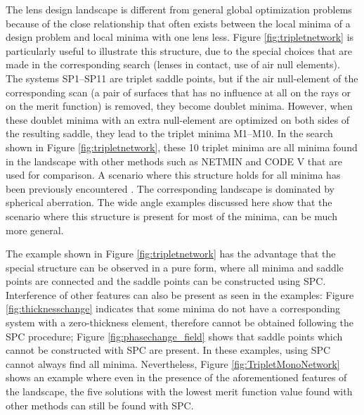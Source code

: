 The lens design landscape is different from general global optimization problems because of the close relationship that often exists between the local minima of a design problem and local minima with one lens less. Figure \ref{fig:tripletnetwork} is particularly useful to illustrate this structure, due to the special choices that are made in the corresponding search (lenses in contact, use of air null elements). The systems SP1–SP11 are triplet saddle points, but if the air null-element of the corresponding scan (a pair of surfaces that has no influence at all on the rays or on the merit function) is removed, they become doublet minima. However, when these doublet minima with an extra null-element are optimized on both sides of the resulting saddle, they lead to the triplet minima M1–M10. In the search shown in Figure \ref{fig:tripletnetwork}, these 10 triplet minima are all minima found in the landscape with other methods such as NETMIN and CODE V that are used for comparison. A scenario where this structure holds for all minima has been previously encountered \cite{PascalTriplet2009}. The corresponding landscape is dominated by spherical aberration. The wide angle examples discussed here show that the scenario where this structure is present for most of the minima, can be much more general.


The example shown in Figure \ref{fig:tripletnetwork} has the advantage that the special structure can be observed in a pure form, where all minima and saddle points are connected and the saddle points can be constructed using SPC. Interference of other features can also be present as seen in the examples: Figure \ref{fig:thicknesschange} indicates that some minima do not have a corresponding system with a zero-thickness element, therefore cannot be obtained following the SPC procedure; Figure \ref{fig:phasechange_field} shows that saddle points which cannot be constructed with SPC are present. In these examples, using SPC cannot always find all minima. Nevertheless, Figure \ref{fig:TripletMonoNetwork} shows an example where even in the presence of the aforementioned features of the landscape, the five solutions with the lowest merit function value found with other methods can still be found with SPC.

